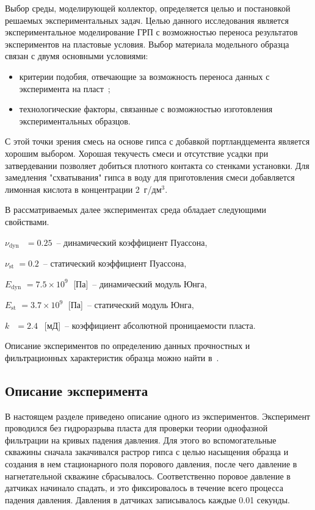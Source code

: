 Выбор среды, моделирующей коллектор, определяется целью и постановкой решаемых экспериментальных задач. Целью данного исследования является экспериментальное моделирование ГРП с возможностью переноса результатов экспериментов на пластовые условия. Выбор материала модельного образца связан с двумя основными условиями:
\begin{itemize}
\item
критерии подобия, отвечающие за возможность переноса данных с эксперимента на пласт~\cite{cleary1994};
\item
технологические факторы, связанные с возможностью изготовления экспериментальных образцов.
\end{itemize}
С этой точки зрения смесь на основе гипса с добавкой портландцемента является хорошим выбором. Хорошая текучесть смеси и отсутствие усадки при затвердевании позволяет добиться плотного контакта со стенками установки. Для замедления "схватывания" гипса в воду для приготовления смеси добавляется лимонная кислота в концентрации 2~г/дм$^3$.

В рассматриваемых далее экспериментах среда обладает следующими свойствами.
\begin{description}
%
\item $\nu_\text{dyn} \;\;\,  = 0.25$~-- динамический коэффициент Пуассона,
\item $\nu_\text{st} \;= 0.2$~-- статический коэффициент Пуассона,
\item $E_\text{dyn} \,\,    = 7.5 \times 10^{9}\;$  [Па]~-- динамический модуль Юнга, 
\item $E_\text{st} \,\,    = 3.7 \times 10^{9}\;$  [Па]~-- статический модуль Юнга, 
\item $k \;\;\,    = 2.4 \;\,$  [мД]~-- коэффициент абсолютной проницаемости пласта.

%
\end{description}

Описание экспериментов по определению данных прочностных и фильтрационных характеристик образца можно найти  в~\cite{trimonova2017, trimonova2018}. 

\subsection{Описание эксперимента}

В настоящем разделе приведено описание одного из экспериментов. Эксперимент проводился без гидроразрыва пласта для  проверки теории однофазной фильтрации на кривых падения давления. Для этого во вспомогательные скважины сначала закачивался растрор гипса с целью насыщения образца и создания в нем стационарного поля порового давления, после чего давление в нагнетательной скважине сбрасывалось. Соответственно поровое давление в датчиках начинало спадать, и это фиксировалось в течение всего процесса падения давления. Давления в датчиках записывалось каждые 0.01 секунды. 


